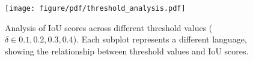 \begin{figure}[t!]
    \centering
    \texttt{[image: figure/pdf/threshold\_analysis.pdf]}
    \caption {
        Analysis of IoU scores across different threshold values ($\delta \in {0.1, 0.2, 0.3, 0.4}$). Each subplot represents a different language, showing the relationship between threshold values and IoU scores. 
    } 
    \label{fig:threshold_analysis}
\end{figure}


